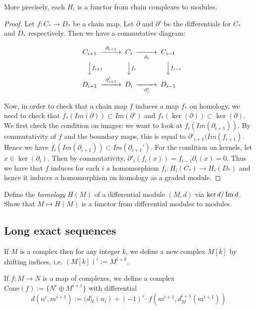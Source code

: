 More precisely, each $H_i$ is a functor from chain complexes to modules.
\begin{proof}
Let $f:C_*\rightarrow D_*$ be a chain map. Let $\partial$ and
$\partial'$ be the differentials for $C_*$ and $D_*$
respectively. Then we have a commutative diagram:

\begin{equation}
\begin{CD}
C_{i+1} @>\partial_{i+1}>> C_i @>>\partial_i> C_{i-1}\\
@VV f_{i+1} V          @VV f_i V             @VVf_{i-1} V\\
D_{i+1} @>\partial'_{i+1}>> D_i @>>\partial'_i> D_{i-1}
\end{CD}
\end{equation}

Now, in order to check that a chain map $f$ induces a map $f_*$
on homology, we need to check that $f_*(Im(\partial))\subset
Im(\partial')$ and $f_*(\ker(\partial))\subset
\ker(\partial)$. We first check the condition on images: we want
to look at $f_i(Im(\partial_{i+1}))$. By commutativity of $f$
and the boundary maps, this is equal to
$\partial'_{i+1}(Im(f_{i+1})$. Hence we have
$f_i(Im(\partial_{i+1}))\subset Im(\partial_{i+1}')$. For the
condition on kernels, let $x\in \ker(\partial_i)$. Then by
commutativity, $\partial'_i(f_i(x))=f_{i-1}\partial_i(x)=0$.
Thus we have that $f$ induces for each $i$ a homomorphism
$f_i:H_i(C_*)\rightarrow H_i(D_*)$ and hence it induces a
homomorphism on homology as a graded module. \end{proof}

\begin{exercise} 
Define the \emph{homology} $H(M)$ of a differential module $(M, d)$ via $\ker d / \operatorname{Im}
d$. Show that $M \mapsto H(M)$ is  a functor from differential modules to
modules.
\end{exercise} 


\subsection{Long exact sequences}

\begin{definition} If $M$ is a complex then for any integer $k$, we define a new complex $M[k]$ by shifting indices, i.e. $(M[k])^i:=M^{i+k}$.\end{definition}

\begin{definition} If $f:M\rightarrow N$ is a map of complexes, we define a complex $\mathrm{Cone}(f):=\{N^i\oplus M^{i+1}\}$ with differential
$$d(n^i,m^{i+1}):= (d_N^i(n_i)+(-1)^i\cdot f(m^{i+1}, d_M^{i+1}(m^{i+1}))$$
\end{definition}

